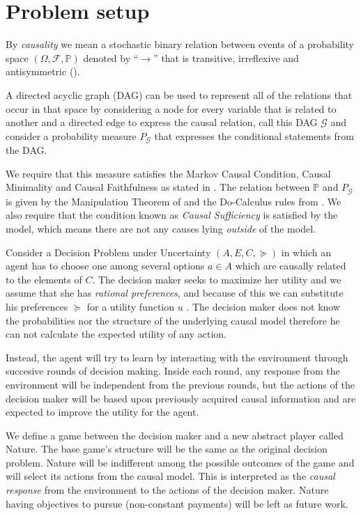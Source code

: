 \documentclass{article}
\begin{document}
\section{Problem setup}{\label{problem_setup}}
By \textit{causality} we mean a stochastic binary relation between events of a probability space $(\Omega, \mathcal{F}, \mathbb{P})$ denoted by $“\to”$ that is transitive, irreflexive and antisymmetric (\cite{spirtes2000causation}). 

A directed acyclic graph (DAG) can be used to represent all of the relations that occur in that space by considering a node for every variable that is related to another and a directed edge to express the causal relation, call this DAG $\mathcal{G}$ and consider a probability measure $P_{\mathcal{G}}$ that expresses the conditional statements from the DAG. 

We require that this measure satisfies the Markov Causal Condition, Causal Minimality and Causal Faithfulness as stated in \cite{spirtes2000causation}. The relation between $\mathbb{P}$ and $P_{\mathcal{G}}$ is given by the Manipulation Theorem of \cite{spirtes2000causation} and the Do-Calculus rules from \cite{pearl2009causality}. We also require that the condition known as \textit{Causal Sufficiency} is satisfied by the model, which means there are not any causes lying \textit{outside} of the model. 

Consider a Decision Problem under Uncertainty $(A,E,C,\succeq)$ in which an agent has to choose one among several options $a \in A$ which are causally related to the elements of $C$. The decision maker seeks to maximize her utility and we assume that she has \textit{rational preferences}, and because of this we can substitute his preferences $\succeq$ for a utility function $u$ \cite{gilboa2009decision}. The decision maker does not know the probabilities nor the structure of the underlying causal model therefore he can not calculate the expected utility of any action. 

Instead, the agent will try to learn by interacting with the environment through succesive rounds of decision making. Inside each round, any response from the environment will be independent from the previous rounds, but the actions of the decision maker will be based upon previously acquired causal information and are expected to improve the utility for the agent.

We define a game between the decision maker and a new abstract player called Nature. The base game's structure will be the same as the original decision problem. Nature will be indifferent among the possible outcomes of the game and will select its actions from the causal model. This is interpreted as the \textit{causal response} from the environment to the actions of the decision maker. Nature having objectives to pursue (non-constant payments) will be left as future work.
\end{document}
